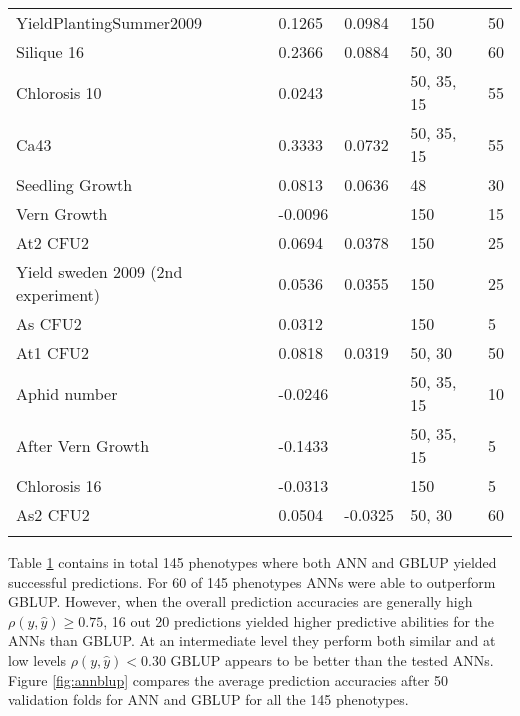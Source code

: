 \begin{longtable}{p{} p{} p{} p{}
  p{}}
  YieldPlantingSummer2009            & 0.1265  & 0.0984               & 150          & 50     \\
  Silique 16                         & 0.2366  & 0.0884               & 50, 30       & 60     \\
  Chlorosis 10                       & 0.0243  & \color{red}{0.088}   & 50, 35, 15   & 55     \\
  Ca43                               & 0.3333  & 0.0732               & 50, 35, 15   & 55     \\
  Seedling Growth                    & 0.0813  & 0.0636               & 48           & 30     \\
  Vern Growth                        & -0.0096 & \color{red}{0.0422}  & 150          & 15     \\
  At2 CFU2                           & 0.0694  & 0.0378               & 150          & 25     \\
  Yield sweden 2009 (2nd experiment) & 0.0536  & 0.0355               & 150          & 25     \\
  As CFU2                            & 0.0312  & \color{red}{0.035}   & 150          & 5      \\
  At1 CFU2                           & 0.0818  & 0.0319               & 50, 30       & 50     \\
  Aphid number                       & -0.0246 & \color{red}{0.029}   & 50, 35, 15   & 10     \\
  After Vern Growth                  & -0.1433 & \color{red}{0.0057}  & 50, 35, 15   & 5      \\
  Chlorosis 16                       & -0.0313 & \color{red}{-0.0121} & 150          & 5      \\
  As2 CFU2                           & 0.0504  & -0.0325              & 50, 30       & 60     \\
  \bottomrule
\label{tab:at_res}
\end{longtable}
\doublespacing


Table \ref{tab:at_res} contains in total 145 phenotypes where both ANN and GBLUP yielded
successful predictions. For 60 of 145 phenotypes ANNs were able to outperform
GBLUP. However, when the overall prediction accuracies are generally high
$\rho(y,\hat{y}) \geq 0.75$, 16 out 20 predictions yielded higher predictive abilities for
the ANNs than GBLUP. At an intermediate level they perform both similar and at low levels
$\rho(y,\hat{y}) < 0.30$ GBLUP appears to be better than the tested ANNs.\\
Figure \ref{fig:annblup} compares the average prediction accuracies after 50 validation
folds for ANN and GBLUP for all the 145 phenotypes.

